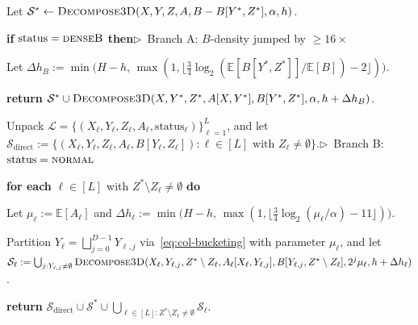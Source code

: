 \documentclass[11pt]{article}
\theoremstyle{definition}
\newcommand{\algcomment}[1]{\hfill $\triangleright$~{\small #1}}
\renewcommand{\label}[1]{}%
\newcommand{\E}{\mathbb{E}}
\newcommand{\dens}[1]{\E[#1]}
\newcommand{\DecomposeThreeD}{\textnormal{\textsc{Decompose3D}}}
\newcommand{\tagdenseB}{\textnormal{\textsc{denseB}}}
\newcommand{\tagnormal}{\textnormal{\textsc{normal}}}
\begin{document}
\begin{algorithm}[!htbp]
\begin{algsteps}[resume]
    \item Let $\mathcal{S}^* \gets \DecomposeThreeD(X, Y, Z, A, B - B[Y^*, Z^*], \alpha, h)$.\label{line:3d-sstar}
    \item \textbf{if} $\text{status} = \tagdenseB$ \textbf{then}\algcomment{Branch A: $B$-density jumped by $\ge 16\times$}\label{line:3d-brancha}
    \item \quad Let $\Delta h_B := \min\!\big(H - h, \, \max(1, \lfloor \frac{3}{4}\log_2(\dens{B[Y^*, Z^*]} / \dens{B}) - 2 \rfloor)\big)$.\label{line:3d-dhb}
    \item \quad \textbf{return} $\mathcal{S}^* \cup \DecomposeThreeD(X, Y^*, Z^*, A[X, Y^*], B[Y^*, Z^*], \alpha, h + \Delta h_B)$.\label{line:3d-recb}
    \item Unpack $\mathcal{L} = \{(X_\ell, Y_\ell, Z_\ell, A_\ell, \text{status}_\ell)\}_{\ell=1}^L$, and let $\mathcal{S}_{\text{direct}} := \{(X_\ell, Y_\ell, Z_\ell, A_\ell, B[Y_\ell, Z_\ell]) : \ell \in [L] \text{ with } Z_\ell \ne \emptyset\}$.\algcomment{Branch B: $\text{status} = \tagnormal$}\label{line:3d-direct}
    \item \textbf{for each} $\ell \in [L]$ with $Z^* \setminus Z_\ell \ne \emptyset$ \textbf{do}\label{line:3d-loop}
    \item \quad Let $\mu_\ell := \dens{A_\ell}$ and $\Delta h_\ell := \min\!\big(H - h, \, \max(1, \lfloor \frac{3}{4}\log_2(\mu_\ell / \alpha) - 11 \rfloor)\big)$.\label{line:3d-dhl}
    \item \quad Partition $Y_\ell = \bigsqcup_{j=0}^{D-1} Y_{\ell, j}$ via~\eqref{eq:col-bucketing} with parameter $\mu_\ell$, and let $\mathcal{S}_\ell := \bigcup_{j : Y_{\ell, j} \ne \emptyset} \DecomposeThreeD(X_\ell, Y_{\ell, j}, Z^* \setminus Z_\ell, A_\ell[X_\ell, Y_{\ell, j}], B[Y_{\ell, j}, Z^* \setminus Z_\ell], 2^j\mu_\ell, h + \Delta h_\ell)$.\label{line:3d-reca}
    \item \textbf{return} $\mathcal{S}_{\text{direct}} \cup \mathcal{S}^* \cup \bigcup_{\ell \in [L] : Z^* \setminus Z_\ell \ne \emptyset} \mathcal{S}_\ell$.\label{line:3d-ret}
\end{algsteps}
\end{algorithm}
\end{document}
